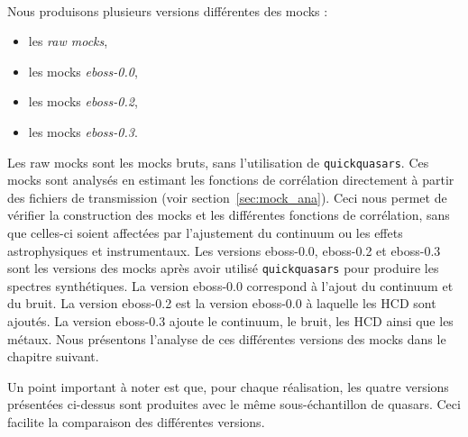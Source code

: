 \paragraph{}
Nous produisons plusieurs versions différentes des mocks :
\begin{itemize}
\item les \emph{raw mocks},
\item les mocks \emph{eboss-0.0}, 
\item les mocks \emph{eboss-0.2},
\item les mocks \emph{eboss-0.3}.
\end{itemize}
Les raw mocks sont les mocks bruts, sans l'utilisation de \texttt{quickquasars}. Ces mocks sont analysés en estimant les fonctions de corrélation directement à partir des fichiers de transmission (voir section~\ref{sec:mock_ana}). Ceci nous permet de vérifier la construction des mocks et les différentes fonctions de corrélation, sans que celles-ci soient affectées par l'ajustement du continuum ou les effets astrophysiques et instrumentaux.
Les versions eboss-0.0, eboss-0.2 et eboss-0.3 sont les versions des mocks après avoir utilisé \texttt{quickquasars} pour produire les spectres synthétiques. La version eboss-0.0 correspond à l'ajout du continuum et du bruit. La version eboss-0.2 est la version eboss-0.0 à laquelle les HCD sont ajoutés. La version eboss-0.3 ajoute le continuum, le bruit, les HCD ainsi que les métaux.
Nous présentons l'analyse de ces différentes versions des mocks dans le chapitre suivant.

Un point important à noter est que, pour chaque réalisation, les quatre versions présentées ci-dessus sont produites avec le même sous-échantillon de quasars. Ceci facilite la comparaison des différentes versions.



% 
